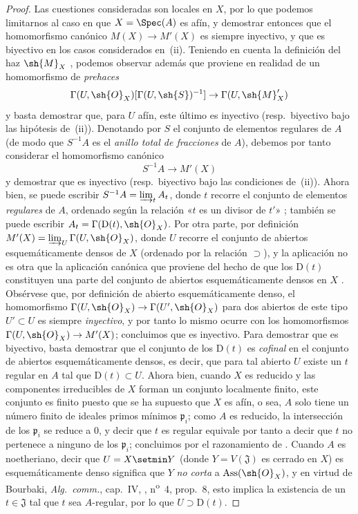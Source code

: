 \begin{proof}
Las cuestiones consideradas son locales en $X$, por lo que podemos limitarnos al caso en que $X=\Spec(A)$ es afín, y demostrar entonces que el homomorfismo canónico $M(X)\to M'(X)$ es siempre inyectivo, y que es biyectivo en los casos considerados en~(ii).
Teniendo en cuenta la definición del haz $\sh{M}_X$ , podemos observar además que  proviene en realidad de un homomorfismo de \emph{prehaces}
\[
  \Gamma(U,\sh{O}_X)[\Gamma(U,\sh{S})^{-1}]\to\Gamma(U,\sh{M}'_X)
\]
y basta demostrar que, para $U$ afín, este último es inyectivo (resp.\ biyectivo bajo las hipótesis de~(ii)).
Denotando por $S$ el conjunto de elementos regulares de $A$ (de modo que $S^{-1}A$ es el \emph{anillo total de fracciones} de $A$), debemos por tanto considerar el homomorfismo canónico
\[
\label{IV.20.2.11.1}
  S^{-1}A\to M'(X)
  \tag{20.2.11.1}
\]
y demostrar que es inyectivo (resp.\ biyectivo bajo las condiciones de~(ii)).
Ahora bien, se puede escribir $S^{-1}A=\varinjlim_t A_t$, donde $t$ recorre el conjunto de elementos \emph{regulares} de $A$, ordenado según la relación «$t$ es un divisor de $t'$» ; también se puede escribir $A_t=\Gamma(\mathrm{D}(t),\sh{O}_X)$.
Por otra parte, por definición $M'(X)=\varinjlim_U\Gamma(U,\sh{O}_X)$, donde $U$ recorre el conjunto de abiertos esquemáticamente densos de $X$ (ordenado por la relación $\supset$), y la aplicación  no es otra que la aplicación canónica que proviene del hecho de que los $\mathrm{D}(t)$ constituyen una parte del conjunto de abiertos esquemáticamente densos en $X$ .
Obsérvese que, por definición de abierto esquemáticamente denso, el homomorfismo $\Gamma(U,\sh{O}_X)\to\Gamma(U',\sh{O}_X)$ para dos abiertos de este tipo $U'\subset U$ es siempre \emph{inyectivo}, y por tanto lo mismo ocurre con los homomorfismos $\Gamma(U,\sh{O}_X)\to M'(X)$; concluimos que  es inyectivo.
Para demostrar que  es biyectivo, basta demostrar que el conjunto de los $\mathrm{D}(t)$ es \emph{cofinal} en el conjunto de abiertos esquemáticamente densos, es decir, que para tal abierto $U$ existe un $t$ regular en $A$ tal que $\mathrm{D}(t)\subset U$.
Ahora bien, cuando $X$ es reducido y las componentes irreducibles de $X$ forman un conjunto localmente finito, este conjunto es finito puesto que se ha supuesto que $X$ es afín, o sea, $A$ solo tiene un número finito de ideales primos mínimos $\mathfrak{p}_i$; como $A$ es reducido, la intersección de los $\mathfrak{p}_i$ se reduce a $0$, y decir que $t$ es regular equivale por tanto a decir que $t$ no pertenece a ninguno de los $\mathfrak{p}_i$; concluimos por el razonamiento de .
Cuando $A$ es noetheriano, decir que $U=X\setmin Y$ (donde $Y=V(\mathfrak{J})$ es cerrado en $X$) es esquemáticamente denso significa  que $Y$ \emph{no corta} a $\operatorname{Ass}(\sh{O}_X)$, y en virtud de Bourbaki, \emph{Alg.~comm.}, cap.~IV, , n\textsuperscript{o}~4, prop.~8, esto implica la existencia de un $t\in\mathfrak{J}$ tal que $t$ sea $A$-regular, por lo que $U\supset\mathrm{D}(t)$.


\end{proof}

